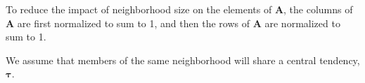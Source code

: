 
        To reduce the impact of neighborhood size on the elements
        of $\mathbf{A}$, the columns of $\mathbf{A}$ are first
        normalized to sum to 1, and then the rows of $\mathbf{A}$
        are normalized to sum to 1.

        We assume that members of the same neighborhood will
        share a central tendency, $\mathbf{\tau}$.
